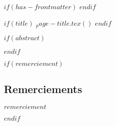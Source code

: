 $if(has-frontmatter)$
\frontmatter
$endif$

$if(title)$
  $_page-title.tex()$
$endif$


$if(abstract)$
  \renewcommand{\abstractname}{\section*{Résumé}\label{ruxe9sumuxe9}}
  \begin{abstract}
    \begin{center}
      $abstract$
    \end{center}
    {\newpage}
  \end{abstract}
$endif$

$if(remerciement)$
  \begin{center}
    \section*{Remerciements}\label{remerciement}
    $remerciement$
  \end{center}
  {\newpage}
$endif$
